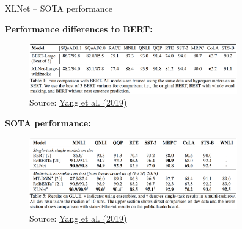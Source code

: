\begin{frame}{XLNet -- SOTA performance}

\vfill

	\textbf{Performance differences to BERT:}

	\begin{figure}
		\centering
		\includegraphics[width = 9cm]{figure/xlnet-vs-bert.png}\\ 
		\footnotesize{Source:} \href{https://papers.nips.cc/paper/8812-xlnet-generalized-autoregressive-pretraining-for-language-understanding.pdf}{\footnotesize Yang et al. (2019)}
	\end{figure}

	\textbf{SOTA performance:}

	\begin{figure}
		\centering
		\includegraphics[width = 9cm]{figure/xlnet-sota.png}\\ 
		\footnotesize{Source:} \href{https://papers.nips.cc/paper/8812-xlnet-generalized-autoregressive-pretraining-for-language-understanding.pdf}{\footnotesize Yang et al. (2019)}
	\end{figure}
	
\vfill

\end{frame}


\endlecture

